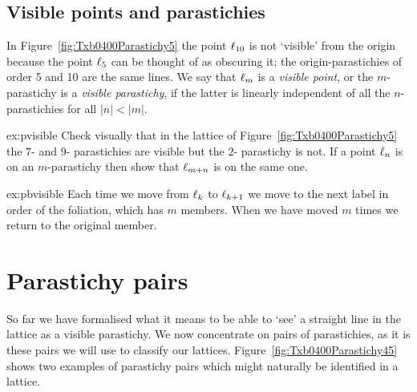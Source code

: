 \subsection{Visible points and parastichies}
In Figure~\ref{fig:Txb0400Parastichy5} the point $\ell_{{10}}$ is not `visible' from the origin because the point $\ell_{{5}}$ can be thought of as obscuring it; the 
origin-parastichies of order 5 and 10 are the same lines. 
We say that $\ell_{{m}}$ is a \emph{visible point}, or the $m$-parastichy is a \emph{visible parastichy}, if the latter is linearly independent of all the $n$-parastichies for all $|n|<|m|$. 
\begin{jExercise}{ex:pvisible}
	Check  visually that in the lattice of Figure~\ref{fig:Txb0400Parastichy5} the $7$- and $9$- parastichies are visible but the $2$- parastichy is not.
If a point $\ell_{{n}}$ is on an $m$-parastichy then show that $\ell_{{m+n}}$ is on the same one.
\label{ex:bb}
\end{jExercise}
\begin{jAnswer}{ex:pbvisible}
	Each time we move from $\ell_{{k}}$ to $\ell_{{k+1}}$ we move to the next label in order of the foliation, which has $m$ members. When we have moved $m$ times we return to the original member.
\end{jAnswer}




\clearpage
\section{Parastichy pairs}

So far we have formalised what it means to be able to `see' a straight line in the lattice as a visible parastichy. 
We now concentrate on pairs of parastichies, as it is these pairs we will use to classify our lattices. Figure~\ref{fig:Txb0400Parastichy45} shows two examples of parastichy pairs which might naturally be identified in a lattice. 





